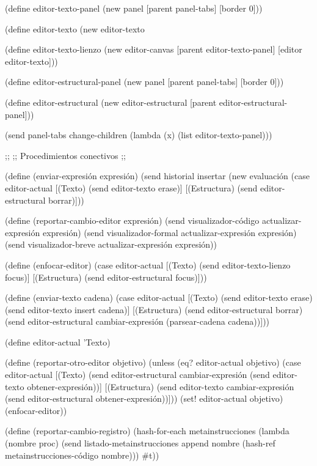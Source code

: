 \documentclass[10pt,oneside,openany,letterpaper]{book}
\begin{document}
(define editor-texto-panel
  (new panel%
       [parent panel-tabs]
       [border 0]))

(define editor-texto (new editor-texto%

(define editor-texto-lienzo
  (new editor-canvas%
       [parent editor-texto-panel]
       [editor editor-texto]))

(define editor-estructural-panel
  (new panel%
       [parent panel-tabs]
       [border 0]))

(define editor-estructural (new editor-estructural%
                                [parent editor-estructural-panel]))

(send panel-tabs change-children (lambda (x) (list editor-texto-panel)))

;;
;; Procedimientos conectivos
;; 

(define (enviar-expresión expresión)
  (send historial insertar
        (new evaluación%
  (case editor-actual
    [(Texto)
     (send editor-texto erase)]
    [(Estructura)
     (send editor-estructural borrar)]))

(define (reportar-cambio-editor expresión)
  (send visualizador-código actualizar-expresión expresión)
  (send visualizador-formal actualizar-expresión expresión)
  (send visualizador-breve actualizar-expresión expresión))

(define (enfocar-editor)
  (case editor-actual
    [(Texto)
     (send editor-texto-lienzo focus)]
    [(Estructura)
     (send editor-estructural focus)]))

(define (enviar-texto cadena)
  (case editor-actual
    [(Texto)
     (send editor-texto erase)
     (send editor-texto insert cadena)]
    [(Estructura)
     (send editor-estructural borrar)
     (send editor-estructural cambiar-expresión
           (parsear-cadena cadena))]))

(define editor-actual 'Texto)

(define (reportar-otro-editor objetivo)
  (unless (eq? editor-actual objetivo)
    (case editor-actual
      [(Texto)
       (send editor-estructural cambiar-expresión
             (send editor-texto obtener-expresión))]
      [(Estructura)
       (send editor-texto cambiar-expresión
             (send editor-estructural obtener-expresión))]))
  (set! editor-actual objetivo)
  (enfocar-editor))

(define (reportar-cambio-registro)
  (hash-for-each metainstrucciones
                 (lambda (nombre proc)
                   (send listado-metainstrucciones append
                         nombre (hash-ref metainstrucciones-código nombre)))
                 #t))
\end{document}
